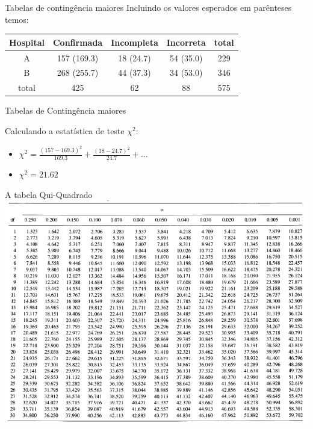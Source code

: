 \documentclass{beamer}
\begin{document}
\begin{frame}{Tabelas de contingência maiores}
  Incluindo os valores esperados em parênteses temos:
  \begin{example}
    \begin{tabular}{c|c|c|c|c}
      Hospital & Confirmada & Incompleta &
      Incorreta & total\\
      \hline
      A & 157 (169.3) & 18 (24.7) & 54 (35.0) & 229\\
      \hline
      B & 268 (255.7) & 44 (37.3) & 34 (53.0) & 346\\
      \hline
      total & 425 & 62 & 88 & 575\\
    \end{tabular}
  \end{example}
\end{frame}

\begin{frame}{Tabelas de Contingência maiores}

  Calculando a estatística de teste $\chi^2$:

  \begin{itemize}
  \item $\chi^2 = \frac{(157 - 169.3)^2}{169.3} +
  \frac{(18-24.7)^2}{24.7}  + \ldots$
\item $\chi^2 = 21.62$
\end{itemize}
\end{frame}


\begin{frame}{A tabela Qui-Quadrado}
  \includegraphics[height=\textheight]{TC/qui-quadrado2}
\end{frame}
\end{document}
